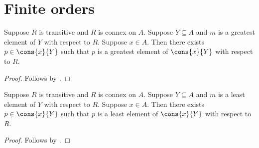 \section{Finite orders}





\begin{proposition}\label{greatest_element_cons}
    Suppose $R$ is transitive and $R$ is connex on $A$.
    Suppose $Y\subseteq A$ and $m$ is a greatest element of $Y$ with respect to $R$.
    Suppose $x\in A$.
    Then there exists $p\in\cons{x}{Y}$ such that
        $p$ is a greatest element of $\cons{x}{Y}$ with respect to $R$.
\end{proposition}
\begin{proof}
    Follows by .
\end{proof}

\begin{proposition}\label{least_element_cons}
    Suppose $R$ is transitive and $R$ is connex on $A$.
    Suppose $Y\subseteq A$ and $m$ is a least element of $Y$ with respect to $R$.
    Suppose $x\in A$.
    Then there exists $p\in\cons{x}{Y}$ such that
        $p$ is a least element of $\cons{x}{Y}$ with respect to $R$.
\end{proposition}
\begin{proof}
    Follows by .
\end{proof}

